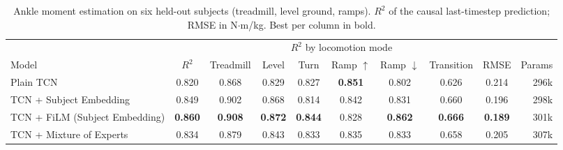 \begin{table}[t]
\centering
\small
\setlength{\tabcolsep}{4pt}
\begin{tabular}{l c cccccc c r}
\toprule
 & & \multicolumn{6}{c}{$R^2$ by locomotion mode} & & \\
\cmidrule(lr){3-8}
Model & $R^2$ & Treadmill & Level & Turn & Ramp $\uparrow$ & Ramp $\downarrow$ & Transition & RMSE & Params \\
\midrule
Plain TCN & 0.820 & 0.868 & 0.829 & 0.827 & \textbf{0.851} & 0.802 & 0.626 & 0.214 & 296k \\
TCN + Subject Embedding & 0.849 & 0.902 & 0.868 & 0.814 & 0.842 & 0.831 & 0.660 & 0.196 & 298k \\
TCN + FiLM (Subject Embedding) & \textbf{0.860} & \textbf{0.908} & \textbf{0.872} & \textbf{0.844} & 0.828 & \textbf{0.862} & \textbf{0.666} & \textbf{0.189} & 301k \\
TCN + Mixture of Experts & 0.834 & 0.879 & 0.843 & 0.833 & 0.835 & 0.833 & 0.658 & 0.205 & 307k \\
\bottomrule
\end{tabular}
\caption{Ankle moment estimation on six held-out subjects (treadmill, level ground, ramps). $R^2$ of the causal last-timestep prediction; RMSE in N$\cdot$m/kg. Best per column in bold.}
\label{tab:terrain_results}
\end{table}
